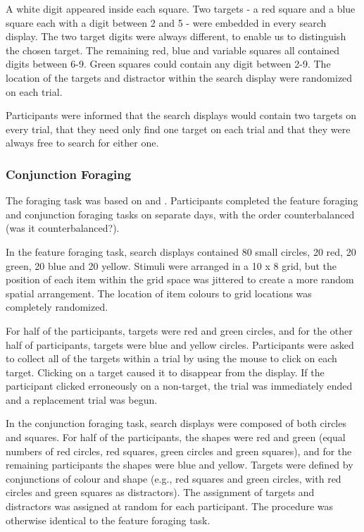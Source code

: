\documentclass[]{rsos}%
\begin{document}
A white digit appeared inside each square. Two targets - a red square and a blue square each with a digit between 2 and 5 - were embedded in every search display. The two target digits were always different, to enable us to distinguish the chosen target. The remaining red, blue and variable squares all contained digits between 6-9. Green squares could contain any digit between 2-9. The location of the targets and distractor within the search display were randomized on each trial.

Participants were informed that the search displays would contain two targets on every trial, that they need only find one target on each trial and that they were always free to search for either one.   

\subsubsection{Conjunction Foraging}

The foraging task was based on \cite{kristjansson2014} and \cite{johannesson2016}. Participants completed the feature foraging and conjunction foraging tasks on separate days, with the order counterbalanced (was it counterbalanced?).

In the feature foraging task, search displays contained 80 small circles, 20 red, 20 green, 20 blue  and 20 yellow. Stimuli were arranged in a 10 x 8 grid, but the position of each item within the grid space was jittered to create a more random spatial arrangement. The location of item colours to grid locations was completely randomized. 

For half of the participants, targets were red and green circles, and for the other half of participants, targets were blue and yellow circles. Participants were asked to collect all of the targets within a trial by using the mouse to click on each target. Clicking on a target caused it to disappear from the display. If the participant clicked erroneously on a non-target, the trial was immediately ended and a replacement trial was begun. 

In the conjunction foraging task, search displays were composed of both circles and squares. For half of the participants, the shapes were red and green (equal numbers of red circles, red squares, green circles and green squares), and for the remaining participants the shapes were blue and yellow. Targets were defined by conjunctions of colour and shape (e.g., red squares and green circles, with red circles and green squares as distractors). The assignment of targets and distractors was assigned at random for each participant. The procedure was otherwise identical to the feature foraging task. 
\end{document}
